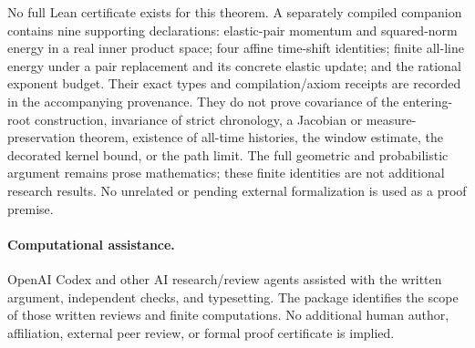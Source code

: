 \documentclass[11pt]{article}
\theoremstyle{definition}\newtheorem{definition}[theorem]{Definition}
\theoremstyle{remark}\newtheorem{remark}[theorem]{Remark}
\numberwithin{equation}{section}
\begin{document}
No full Lean certificate exists for this theorem. A separately compiled
companion contains nine supporting declarations: elastic-pair momentum and
squared-norm energy in a real inner product space; four affine time-shift
identities; finite all-line energy under a pair replacement and its concrete
elastic update; and the rational exponent budget. Their exact types and
compilation/axiom receipts are recorded in the accompanying provenance.
They do not prove covariance of the entering-root construction, invariance
of strict chronology, a Jacobian or measure-preservation theorem, existence
of all-time histories, the window estimate, the decorated kernel bound, or
the path limit. The full geometric and probabilistic argument remains prose
mathematics; these finite identities are not additional research results.
No unrelated or pending external formalization is used as a proof premise.

\paragraph{Computational assistance.}
OpenAI Codex and other AI research/review agents assisted with the written
argument, independent checks, and typesetting. The package identifies the
scope of those written reviews and finite computations. No additional human
author, affiliation, external peer review, or formal proof certificate is
implied.


\end{document}
